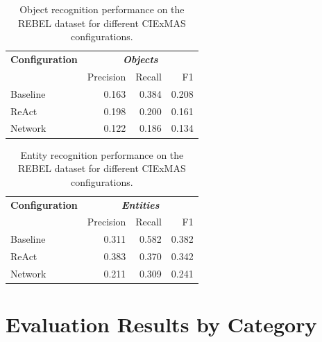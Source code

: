 \documentclass[a4paper,oneside,bibliography=totoc]{scrbook}
\begin{document}
\begin{table}[h]
  \centering
  \begin{tabular}{l|rrr}
    \toprule
    \textbf{Configuration} & \multicolumn{3}{c}{\textit{\textbf{Objects}}}                  \\
                           & Precision                                     & Recall & F1    \\
    \midrule
    Baseline               & 0.163                                         & 0.384  & 0.208 \\
    ReAct                  & 0.198                                         & 0.200  & 0.161 \\
    Network                & 0.122                                         & 0.186  & 0.134 \\
    \bottomrule
  \end{tabular}
  \caption{Object recognition performance on the REBEL dataset for different CIExMAS configurations.}
  \label{tab:rebel_objects}
\end{table}

\begin{table}[h]
  \centering
  \begin{tabular}{l|rrr}
    \toprule
    \textbf{Configuration} & \multicolumn{3}{c}{\textit{\textbf{Entities}}}                  \\
                           & Precision                                      & Recall & F1    \\
    \midrule
    Baseline               & 0.311                                          & 0.582  & 0.382 \\
    ReAct                  & 0.383                                          & 0.370  & 0.342 \\
    Network                & 0.211                                          & 0.309  & 0.241 \\
    \bottomrule
  \end{tabular}
  \caption{Entity recognition performance on the REBEL dataset for different CIExMAS configurations.}
  \label{tab:rebel_entities}
\end{table}

\newpage

\section{Evaluation Results by Category}
\end{document}
